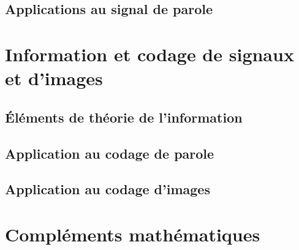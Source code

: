 \documentclass[graybox,envcountchap,envcountsame,sectrefs]{svmono}
\begin{document}
\chapter{Applications au signal de parole}


\part{Information et codage de signaux et d'images}
\chapter{\'El\'ements de th\'eorie de l'information}
\label{info-chap}

\chapter{Application au codage de parole}

\chapter{Application au codage d'images}


\appendix
\part{Compl\'ements math\'ematiques}

\end{document}
